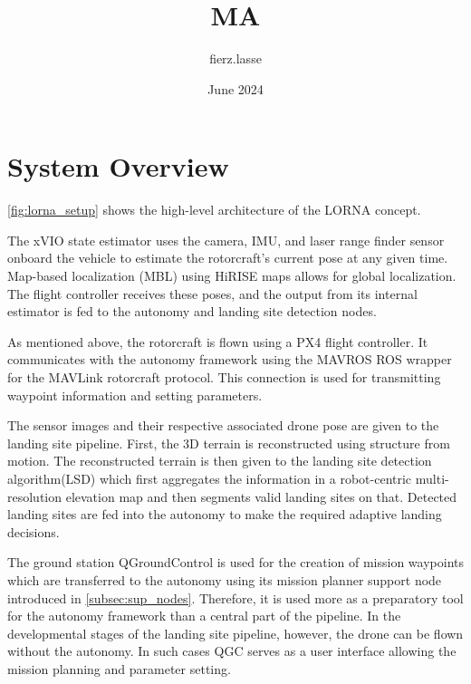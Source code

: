 \documentclass{article}
\title{MA}
\author{fierz.lasse }
\date{June 2024}
\begin{document}
\maketitle



\chapter{System Overview}

\cref{fig:lorna_setup} shows the high-level architecture of the LORNA concept. 

The xVIO state estimator uses the camera, IMU, and laser range finder sensor onboard the vehicle to estimate the rotorcraft's current pose at any given time. Map-based localization (MBL) using HiRISE maps allows for global localization. The flight controller receives these poses, and the output from its internal estimator is fed to the autonomy and landing site detection nodes.

As mentioned above, the rotorcraft is flown using a PX4 flight controller. It communicates with the autonomy framework using the MAVROS ROS wrapper for the MAVLink rotorcraft protocol. This connection is used for transmitting waypoint information and setting parameters.

The sensor images and their respective associated drone pose are given to the landing site pipeline. First, the 3D terrain is reconstructed using structure from motion. The reconstructed terrain is then given to the landing site detection algorithm(LSD) which first aggregates the information in a robot-centric multi-resolution elevation map and then segments valid landing sites on that. Detected landing sites are fed into the autonomy to make the required adaptive landing decisions.

The ground station QGroundControl is used for the creation of mission waypoints which are transferred to the autonomy using its mission planner support node introduced in \cref{subsec:sup_nodes}. Therefore, it is used more as a preparatory tool for the autonomy framework than a central part of the pipeline. In the developmental stages of the landing site pipeline, however, the drone can be flown without the autonomy. In such cases QGC serves as a user interface allowing the mission planning and parameter setting. 


\clearpage %
\end{document}
